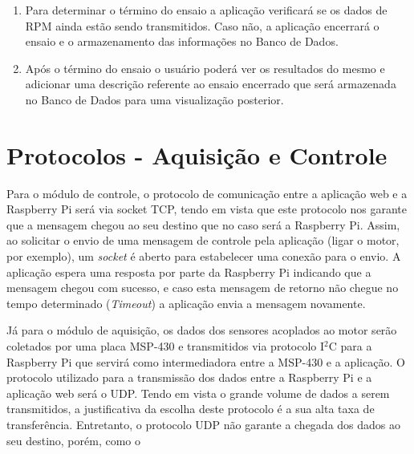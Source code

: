 \begin{enumerate}
	\item Para determinar o término do ensaio a aplicação verificará se os dados de RPM ainda estão sendo transmitidos. Caso não, a aplicação encerrará o ensaio e o armazenamento das informações no Banco de Dados.
	
	\item 	Após o término do ensaio o usuário poderá ver os resultados do mesmo e adicionar uma descrição referente ao ensaio encerrado que será armazenada no Banco de Dados para uma visualização posterior.
\end{enumerate}


\section{Protocolos - Aquisição e Controle}

Para o módulo de controle, o protocolo de comunicação entre a aplicação web e a Raspberry Pi será via socket TCP, tendo em vista que este protocolo nos garante que a mensagem chegou ao seu destino que no caso será a Raspberry Pi. Assim, ao solicitar o envio de uma mensagem de controle pela aplicação (ligar o motor, por exemplo), um \textit{socket} é aberto para estabelecer uma conexão para o envio. A aplicação espera uma resposta por parte da Raspberry Pi indicando que a mensagem chegou com sucesso, e caso esta mensagem de retorno não chegue no tempo determinado (\textit{Timeout}) a aplicação envia a mensagem novamente.


Já para o módulo de aquisição, os dados dos sensores acoplados ao motor serão coletados por uma placa MSP-430 e transmitidos via protocolo I$^{2}$C para a Raspberry Pi que servirá como intermediadora entre a MSP-430 e a aplicação. O protocolo utilizado para a transmissão dos dados entre a Raspberry Pi e a aplicação web será o UDP. Tendo em vista o grande volume de dados a serem transmitidos, a justificativa da escolha deste protocolo é a sua alta taxa de transferência. Entretanto, o protocolo UDP não garante a chegada dos dados ao seu destino, porém, como o 
